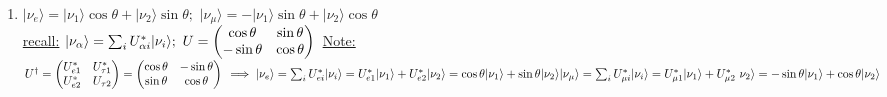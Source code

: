 \documentclass[12pt]{amsart}
\begin{document}
\begin{enumerate}
\item \underline{$| \nu_e \rangle = | \nu_1 \rangle \cos \theta + | \nu_2 \rangle \sin \theta;\,\, | \nu_{\mu} \rangle = - | \nu_1 \rangle \sin \theta + | \nu_2 \rangle \cos \theta$}\\
\underline{recall:} $| \nu_{\alpha} \rangle = \sum_i U_{\alpha i}^* | \nu_i \rangle;\,\, U = \begin{pmatrix} \cos \theta & \sin \theta \\ - \sin \theta & \cos \theta \end{pmatrix}\\$
\underline{Note:} $ U^{\dagger} = \begin{pmatrix} U_{e 1}^* & U_{\tau 1}^* \\ U_{e 2}^* & U_{\tau 2} \end{pmatrix} = \begin{pmatrix} \cos \theta & - \sin \theta \\ \sin \theta & \cos \theta \end{pmatrix}\\
\implies | \nu_e \rangle = \sum_i U_{e i}^* | \nu_i \rangle = U_{e 1}^* | \nu_1 \rangle + U_{e 2}^* | \nu_2 \rangle\\
= \cos \theta | \nu_1 \rangle + \sin \theta | \nu_2 \rangle\\
| \nu_{\mu} \rangle = \sum_i U_{\mu i}^* | \nu_i \rangle = U_{\mu 1}^* | \nu_1 \rangle + U_{\mu 2}^* \ \nu_2 \rangle\\
= - \sin \theta | \nu_1 \rangle + \cos \theta | \nu_2 \rangle\\
$

\hdashrule[0.5ex][c]{\linewidth}{0.5pt}{1.5mm}



\end{enumerate}
\end{document}
